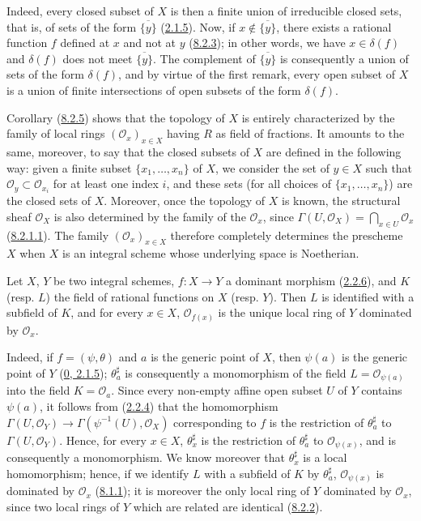 Indeed, every closed subset of $X$ is then a finite union of irreducible
closed sets, that is, of sets of the form $\overline{\{y\}}$
(\hyperref[I.2.1.5]{2.1.5}). Now, if
$x\notin\overline{\{y\}}$, there exists a rational function $f$ defined at
$x$ and not at $y$ (\hyperref[I.8.2.3]{8.2.3}); in other words, we have
$x\in\delta(f)$ and $\delta(f)$ does not meet $\overline{\{y\}}$. The
complement of $\overline{\{y\}}$ is consequently a union of sets of the
form $\delta(f)$, and by virtue of the first remark, every open subset of $X$
is a union of finite intersections of open subsets of the form $\delta(f)$.

\begin{env}[8.2.6]
\label{I.8.2.6}
Corollary (\hyperref[I.8.2.5]{8.2.5}) shows that the topology of $X$ is
entirely characterized by the family of local rings
$(\mathscr{O}_x)_{x\in X}$ having $R$ as field of fractions. It amounts to
the same, moreover, to say that the closed subsets of $X$ are defined in the
following way: given a finite subset
$\{x_1,\ldots,x_n\}$ of $X$, we consider the set of $y\in X$ such that
$\mathscr{O}_y\subset\mathscr{O}_{x_i}$ for at least one index $i$, and these
sets (for all choices of $\{x_1,\ldots,x_n\}$) are the closed sets of $X$.
Moreover, once the topology of $X$ is known, the structural sheaf
$\mathscr{O}_X$ is also determined by the family of the
$\mathscr{O}_x$, since
$\Gamma(U,\mathscr{O}_X)=\bigcap_{x\in U}\mathscr{O}_x$
(\hyperref[I.8.2.1.1]{8.2.1.1}). The family
$(\mathscr{O}_x)_{x\in X}$ therefore completely determines the prescheme $X$
when $X$ is an integral scheme whose underlying space is Noetherian.
\end{env}

\begin{proposition}[8.2.7]
\label{I.8.2.7}
Let $X$, $Y$ be two integral schemes, $f:X\to Y$ a dominant morphism
(\hyperref[I.2.2.6]{2.2.6}), and $K$ (resp. $L$) the field of rational
functions on $X$ (resp. $Y$). Then $L$ is identified with a subfield of
$K$, and for every $x\in X$, $\mathscr{O}_{f(x)}$ is the unique local ring of
$Y$ dominated by $\mathscr{O}_x$.
\end{proposition}

Indeed, if $f=(\psi,\theta)$ and $a$ is the generic point of $X$, then
$\psi(a)$ is the generic point of $Y$
(\hyperref[0.2.1.5]{0, 2.1.5}); $\theta_a^\sharp$ is consequently a
monomorphism of the field $L=\mathscr{O}_{\psi(a)}$ into the field
$K=\mathscr{O}_a$. Since every non-empty affine open subset $U$ of $Y$ contains
$\psi(a)$, it follows from (\hyperref[I.2.2.4]{2.2.4}) that the
homomorphism
$\Gamma(U,\mathscr{O}_Y)\to\Gamma(\psi^{-1}(U),\mathscr{O}_X)$ corresponding
to $f$ is the restriction of $\theta_a^\sharp$ to
$\Gamma(U,\mathscr{O}_Y)$. Hence, for every $x\in X$,
$\theta_x^\sharp$ is the restriction of $\theta_a^\sharp$ to
$\mathscr{O}_{\psi(x)}$, and is consequently a monomorphism. We know moreover
that $\theta_x^\sharp$ is a local homomorphism; hence, if we identify $L$ with
a subfield of $K$ by $\theta_a^\sharp$, $\mathscr{O}_{\psi(x)}$ is dominated
by $\mathscr{O}_x$ (\hyperref[I.8.1.1]{8.1.1}); it is moreover the only
local ring of $Y$ dominated by $\mathscr{O}_x$, since two local rings of
$Y$ which are related are identical
(\hyperref[I.8.2.2]{8.2.2}).


